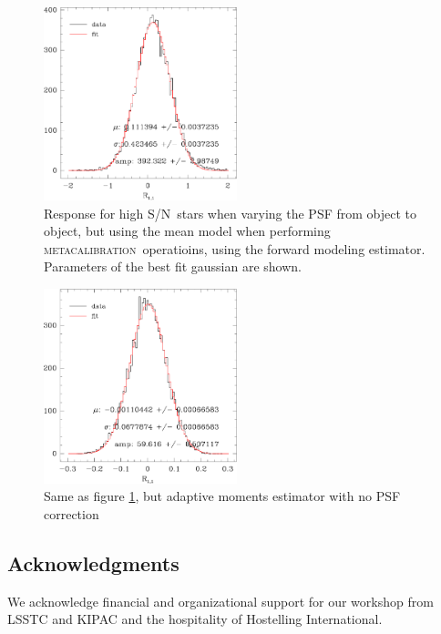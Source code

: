 \documentclass[\docopts]{\docclass}
\newcommand{\mcal}{\textsc{metacalibration}}
\newcommand{\snr}{S/N}
\begin{document}
\begin{figure}[h]
    \centering
    \includegraphics[width=0.5\textwidth]{figures/test_psf_var-000-R11.pdf}

    \caption{Response for high \snr\ stars when varying the PSF from
    object to object, but using
    the mean model when performing \mcal\ operatioins, using the forward modeling estimator.
    Parameters of the best fit gaussian are shown. }

	\label{fig:Rstarfm}

\end{figure}
\begin{figure}[h]
    \centering
    \includegraphics[width=0.5\textwidth]{figures/test_psf_var-000-R11-admom.pdf}

    \caption{Same as figure \ref{fig:Rstarfm}, but adaptive moments estimator with no PSF correction}

	\label{fig:Rstaram}

\end{figure}




\subsection*{Acknowledgments}

We acknowledge financial and organizational support for our workshop from LSSTC and KIPAC and the hospitality of Hostelling International.





\end{document}
